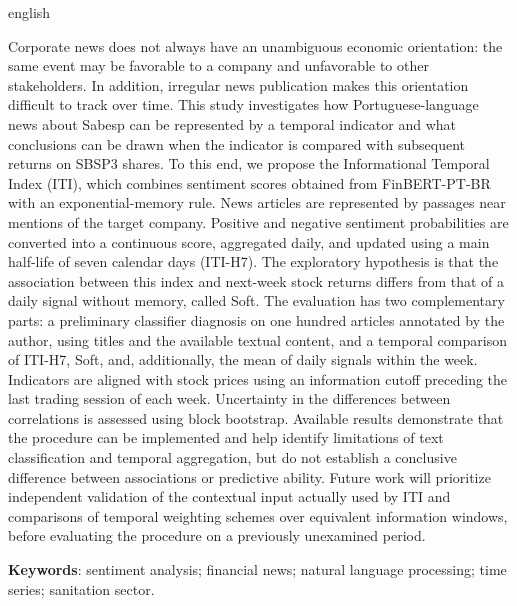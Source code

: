 \begin{resumo}[Abstract]
\begin{otherlanguage*}{english}

Corporate news does not always have an unambiguous economic orientation: the same event may be favorable to a company and unfavorable to other stakeholders. In addition, irregular news publication makes this orientation difficult to track over time. This study investigates how Portuguese-language news about Sabesp can be represented by a temporal indicator and what conclusions can be drawn when the indicator is compared with subsequent returns on SBSP3 shares. To this end, we propose the Informational Temporal Index (ITI), which combines sentiment scores obtained from FinBERT-PT-BR with an exponential-memory rule. News articles are represented by passages near mentions of the target company. Positive and negative sentiment probabilities are converted into a continuous score, aggregated daily, and updated using a main half-life of seven calendar days (ITI-H7). The exploratory hypothesis is that the association between this index and next-week stock returns differs from that of a daily signal without memory, called Soft. The evaluation has two complementary parts: a preliminary classifier diagnosis on one hundred articles annotated by the author, using titles and the available textual content, and a temporal comparison of ITI-H7, Soft, and, additionally, the mean of daily signals within the week. Indicators are aligned with stock prices using an information cutoff preceding the last trading session of each week. Uncertainty in the differences between correlations is assessed using block bootstrap. Available results demonstrate that the procedure can be implemented and help identify limitations of text classification and temporal aggregation, but do not establish a conclusive difference between associations or predictive ability. Future work will prioritize independent validation of the contextual input actually used by ITI and comparisons of temporal weighting schemes over equivalent information windows, before evaluating the procedure on a previously unexamined period.

\vspace{\onelineskip}

\noindent
\textbf{Keywords}: sentiment analysis; financial news; natural language processing; time series; sanitation sector.
\end{otherlanguage*}
\end{resumo}
